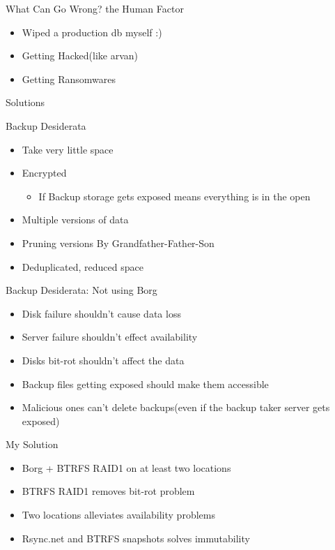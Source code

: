 \documentclass{beamer}
\begin{document}
\begin{frame}{What Can Go Wrong? the Human Factor}
	\begin{itemize}
		\item Wiped a production db myself :) 
		\item Getting Hacked(like arvan)
		\item Getting Ransomwares
	\end{itemize}
\end{frame}


\begin{frame}
	\begin{center}
		\Huge Solutions
	\end{center}
\end{frame}

\begin{frame}{Backup Desiderata}
	\begin{itemize}
		\item Take very little space
		\item Encrypted
		\begin{itemize}
			\item If Backup storage gets exposed means everything is in the open
		\end{itemize}
		\item Multiple versions of data
		\item Pruning versions By Grandfather-Father-Son
		\item Deduplicated, reduced space
	\end{itemize}
\end{frame}


\begin{frame}{Backup Desiderata: Not using Borg}
\begin{itemize}
	\item Disk failure shouldn't cause data loss
	\item Server failure shouldn't effect availability
	\item Disks bit-rot shouldn't affect the data
	\item Backup files getting exposed should make them accessible
	\item Malicious ones can't delete backups(even if the backup taker server gets exposed)
\end{itemize}
\end{frame}
\begin{frame}{My Solution}
\begin{itemize}
\item Borg + BTRFS RAID1 on at least two locations  

\item BTRFS RAID1 removes bit-rot problem

\item Two locations alleviates availability problems

\item Rsync.net and BTRFS snapshots solves immutability 
\end{itemize}
	 
\end{frame}
\end{document}
